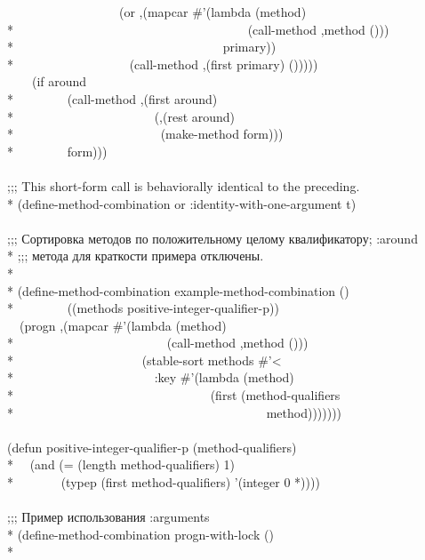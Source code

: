 \begin{defmac}
\begin{lisp}
~~~~~~~~~~~~~~~~~~{\Xbq}(or ,{\Xatsign}(mapcar \#'(lambda (method) \\*
~~~~~~~~~~~~~~~~~~~~~~~~~~~~~~~~~~~~~{\Xbq}(call-method ,method ())) \\*
~~~~~~~~~~~~~~~~~~~~~~~~~~~~~~~~~primary)) \\*
~~~~~~~~~~~~~~~~~~{\Xbq}(call-method ,(first primary) ())))) \\
~~~~(if around \\*
~~~~~~~~{\Xbq}(call-method ,(first around) \\*
~~~~~~~~~~~~~~~~~~~~~~(,{\Xatsign}(rest around) \\*
~~~~~~~~~~~~~~~~~~~~~~~(make-method form))) \\*
~~~~~~~~form))) \\
\\
;;; This short-form call is behaviorally identical to the preceding. \\*
(define-method-combination or :identity-with-one-argument t) \\
 \\
;;; Сортировка методов по положительному целому квалификатору; :around \\*
;;; метода для краткости примера отключены. \\*
\\*
(define-method-combination example-method-combination () \\*
~~~~~~~~((methods positive-integer-qualifier-p)) \\
~~{\Xbq}(progn ,{\Xatsign}(mapcar \#'(lambda (method) \\*
~~~~~~~~~~~~~~~~~~~~~~~~{\Xbq}(call-method ,method ())) \\*
~~~~~~~~~~~~~~~~~~~~(stable-sort methods \#'< \\*
~~~~~~~~~~~~~~~~~~~~~~:key \#'(lambda (method) \\*
~~~~~~~~~~~~~~~~~~~~~~~~~~~~~~~(first (method-qualifiers \\*
~~~~~~~~~~~~~~~~~~~~~~~~~~~~~~~~~~~~~~~~method))))))) \\
\\
(defun positive-integer-qualifier-p (method-qualifiers) \\*
~~(and (= (length method-qualifiers) 1) \\*
~~~~~~~(typep (first method-qualifiers) '(integer 0 *)))) \\
\\
;;; Пример использования :arguments \\*
(define-method-combination progn-with-lock () \\*

\end{lisp}
\end{defmac}
